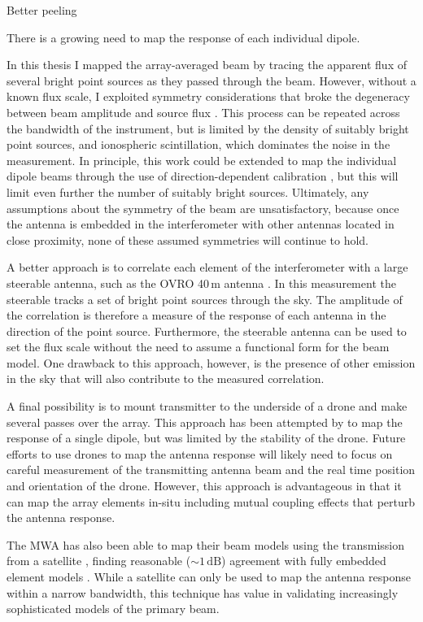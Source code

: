\begin{bibunit}
Better peeling

There is a growing need to map the response of each individual dipole.

In this thesis I mapped the array-averaged beam by tracing the apparent flux of several bright point
sources as they passed through the beam. However, without a known flux scale, I exploited symmetry
considerations that broke the degeneracy between beam amplitude and source flux \citep[inspired
by][]{2012AJ....143...53P}. This process can be repeated across the bandwidth of the instrument, but
is limited by the density of suitably bright point sources, and ionospheric scintillation, which
dominates the noise in the measurement. In principle, this work could be extended to map the
individual dipole beams through the use of direction-dependent calibration
\citep{2008ISTSP...2..707M}, but this will limit even further the number of suitably bright sources.
Ultimately, any assumptions about the symmetry of the beam are unsatisfactory, because once the
antenna is embedded in the interferometer with other antennas located in close proximity, none of
these assumed symmetries will continue to hold.

A better approach is to correlate each element of the interferometer with a large steerable antenna,
such as the OVRO 40\,m antenna \citep[e.g.,][]{2016SPIE.9906E..0DB}. In this measurement the
steerable tracks a set of bright point sources through the sky. The amplitude of the correlation is
therefore a measure of the response of each antenna in the direction of the point source.
Furthermore, the steerable antenna can be used to set the flux scale without the need to assume a
functional form for the beam model. One drawback to this approach, however, is the presence of other
emission in the sky that will also contribute to the measured correlation.

A final possibility is to mount transmitter to the underside of a drone and make several passes over
the array. This approach has been attempted by \citet{2017PASP..129c5002J} to map the response of a
single dipole, but was limited by the stability of the drone. Future efforts to use drones to map
the antenna response will likely need to focus on careful measurement of the transmitting antenna
beam and the real time position and orientation of the drone. However, this approach is advantageous
in that it can map the array elements in-situ including mutual coupling effects that perturb the
antenna response.

The MWA has also been able to map their beam models using the transmission from a satellite
\citep{2018arXiv180804516L}, finding reasonable ($\sim 1\,\text{dB}$) agreement with fully embedded
element models \citep{2017PASA...34...62S}. While a satellite can only be used to map the antenna
response within a narrow bandwidth, this technique has value in validating increasingly
sophisticated models of the primary beam.

\end{bibunit}

